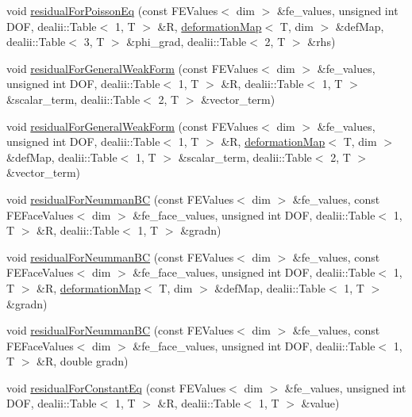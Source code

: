\begin{DoxyCompactItemize}
\item 
void \mbox{\hyperlink{class_residual_ada0899a86c88ceb84cc3c1155663b8ba}{residual\+For\+Poisson\+Eq}} (const F\+E\+Values$<$ dim $>$ \&fe\+\_\+values, unsigned int D\+OF, dealii\+::\+Table$<$ 1, T $>$ \&R, \mbox{\hyperlink{structdeformation_map}{deformation\+Map}}$<$ T, dim $>$ \&def\+Map, dealii\+::\+Table$<$ 3, T $>$ \&phi\+\_\+grad, dealii\+::\+Table$<$ 2, T $>$ \&rhs)
\item 
void \mbox{\hyperlink{class_residual_ab90bb5476a96c0e7098264562b313b7b}{residual\+For\+General\+Weak\+Form}} (const F\+E\+Values$<$ dim $>$ \&fe\+\_\+values, unsigned int D\+OF, dealii\+::\+Table$<$ 1, T $>$ \&R, dealii\+::\+Table$<$ 1, T $>$ \&scalar\+\_\+term, dealii\+::\+Table$<$ 2, T $>$ \&vector\+\_\+term)
\item 
void \mbox{\hyperlink{class_residual_a478a5fee7d75f3a16707ad5915a34d3f}{residual\+For\+General\+Weak\+Form}} (const F\+E\+Values$<$ dim $>$ \&fe\+\_\+values, unsigned int D\+OF, dealii\+::\+Table$<$ 1, T $>$ \&R, \mbox{\hyperlink{structdeformation_map}{deformation\+Map}}$<$ T, dim $>$ \&def\+Map, dealii\+::\+Table$<$ 1, T $>$ \&scalar\+\_\+term, dealii\+::\+Table$<$ 2, T $>$ \&vector\+\_\+term)
\item 
void \mbox{\hyperlink{class_residual_ad0e81fca1fe14909b80e709c1e93e393}{residual\+For\+Neumman\+BC}} (const F\+E\+Values$<$ dim $>$ \&fe\+\_\+values, const F\+E\+Face\+Values$<$ dim $>$ \&fe\+\_\+face\+\_\+values, unsigned int D\+OF, dealii\+::\+Table$<$ 1, T $>$ \&R, dealii\+::\+Table$<$ 1, T $>$ \&gradn)
\item 
void \mbox{\hyperlink{class_residual_af2aedfc68848cd35cac392aad840db05}{residual\+For\+Neumman\+BC}} (const F\+E\+Values$<$ dim $>$ \&fe\+\_\+values, const F\+E\+Face\+Values$<$ dim $>$ \&fe\+\_\+face\+\_\+values, unsigned int D\+OF, dealii\+::\+Table$<$ 1, T $>$ \&R, \mbox{\hyperlink{structdeformation_map}{deformation\+Map}}$<$ T, dim $>$ \&def\+Map, dealii\+::\+Table$<$ 1, T $>$ \&gradn)
\item 
void \mbox{\hyperlink{class_residual_a1e66cf9fc807561fc00cffb93c52d37d}{residual\+For\+Neumman\+BC}} (const F\+E\+Values$<$ dim $>$ \&fe\+\_\+values, const F\+E\+Face\+Values$<$ dim $>$ \&fe\+\_\+face\+\_\+values, unsigned int D\+OF, dealii\+::\+Table$<$ 1, T $>$ \&R, double gradn)
\item 
void \mbox{\hyperlink{class_residual_ab1fcf2c2ae911f4d0c73e59e60f1e6ad}{residual\+For\+Constant\+Eq}} (const F\+E\+Values$<$ dim $>$ \&fe\+\_\+values, unsigned int D\+OF, dealii\+::\+Table$<$ 1, T $>$ \&R, dealii\+::\+Table$<$ 1, T $>$ \&value)

\end{DoxyCompactItemize}

